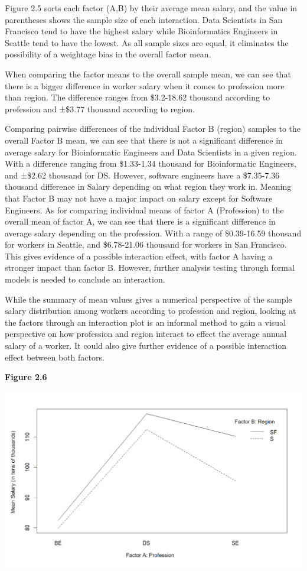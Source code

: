 \documentclass[
]{article}
\begin{document}
Figure 2.5 sorts each factor (A,B) by their average mean salary, and the
value in parentheses shows the sample size of each interaction. Data
Scientists in San Francisco tend to have the highest salary while
Bioinformatics Engineers in Seattle tend to have the lowest. As all
sample sizes are equal, it eliminates the possibility of a weightage
bias in the overall factor mean.

When comparing the factor means to the overall sample mean, we can see
that there is a bigger difference in worker salary when it comes to
profession more than region. The difference ranges from \$3.2-18.62
thousand according to profession and ±\$3.77 thousand according to
region.

Comparing pairwise differences of the individual Factor B (region)
samples to the overall Factor B mean, we can see that there is not a
significant difference in average salary for Bioinformatic Engineers and
Data Scientists in a given region. With a difference ranging from
\$1.33-1.34 thousand for Bioinformatic Engineers, and ±\$2.62 thousand
for DS. However, software engineers have a \$7.35-7.36 thousand
difference in Salary depending on what region they work in. Meaning that
Factor B may not have a major impact on salary except for Software
Engineers. As for comparing individual means of factor A (Profession) to
the overall mean of factor A, we can see that there is a significant
difference in average salary depending on the profession. With a range
of \$0.39-16.59 thousand for workers in Seattle, and \$6.78-21.06
thousand for workers in San Francisco. This gives evidence of a possible
interaction effect, with factor A having a stronger impact than factor
B. However, further analysis testing through formal models is needed to
conclude an interaction.

While the summary of mean values gives a numerical perspective of the
sample salary distribution among workers according to profession and
region, looking at the factors through an interaction plot is an
informal method to gain a visual perspective on how profession and
region interact to effect the average annual salary of a worker. It
could also give further evidence of a possible interaction effect
between both factors.

\textbf{Figure 2.6}

\includegraphics[width=7.29167in,height=\textheight]{Interaction Plot.png}
\end{document}
